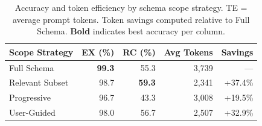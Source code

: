 \begin{table}[t]
\centering
\caption{Accuracy and token efficiency by schema scope strategy. TE = average prompt tokens. Token savings computed relative to Full Schema. \textbf{Bold} indicates best accuracy per column.}
\label{tab:scope_comparison}
\small
\begin{tabular}{lrrrr}
\toprule
Scope Strategy & EX (\%) & RC (\%) & Avg Tokens & Savings \\
\midrule
Full Schema & \textbf{99.3} & 55.3 & 3,739 & --- \\
Relevant Subset & 98.7 & \textbf{59.3} & 2,341 & +37.4\% \\
Progressive & 96.7 & 43.3 & 3,008 & +19.5\% \\
User-Guided & 98.0 & 56.7 & 2,507 & +32.9\% \\
\bottomrule
\end{tabular}
\end{table}